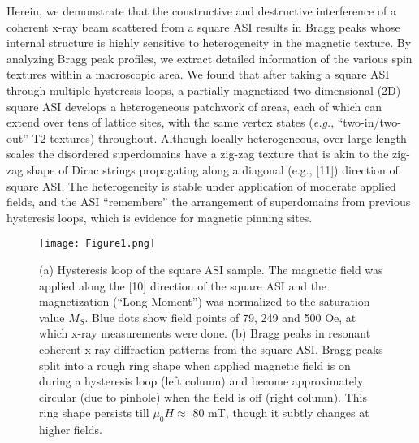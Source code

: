 \documentclass[aps, prb, reprint, showpacs, superscriptaddress]{revtex4-1}
\begin{document}
Herein, we demonstrate that the constructive and destructive interference of a coherent x-ray beam scattered from a square ASI results in Bragg peaks whose internal structure is highly sensitive to heterogeneity in the magnetic texture. 
By analyzing Bragg peak profiles, we extract detailed information of the various spin textures within a macroscopic area. 
We found that after taking a square ASI through multiple hysteresis loops, a partially magnetized two dimensional (2D) square ASI develops a heterogeneous patchwork of areas, each of which can extend over tens of lattice sites, with the same vertex states (\textit{e.g.}, ``two-in/two-out'' T2 textures) throughout.
Although locally heterogeneous, over large length scales the disordered superdomains have a zig-zag texture that is akin to the zig-zag shape of Dirac strings propagating along a diagonal (e.g., [11]) direction of square ASI. 
The heterogeneity is stable under application of moderate applied fields, and the ASI ``remembers'' the arrangement of superdomains from previous hysteresis loops, which is evidence for magnetic pinning sites.\cite{GilbertPRB}

\begin{figure}
\texttt{[image: Figure1.png]}
\caption{
(a) Hysteresis loop of the square ASI sample. 
The magnetic field was applied along the [10] direction of the square ASI and the magnetization (``Long Moment'') was normalized to the saturation value $M_S$. 
Blue dots show field points of 79, 249 and 500 Oe, at which x-ray measurements were done.  
(b) Bragg peaks in resonant coherent x-ray diffraction patterns from the square ASI. 
Bragg peaks split into a rough ring shape when applied magnetic field is on during a hysteresis loop (left column) and become approximately circular (due to pinhole) when the field is off (right column). 
This ring shape persists till $\mu_0H \approx$ 80 mT, though it subtly changes at higher fields.   
}
\label{F1}
\end{figure}
\end{document}
